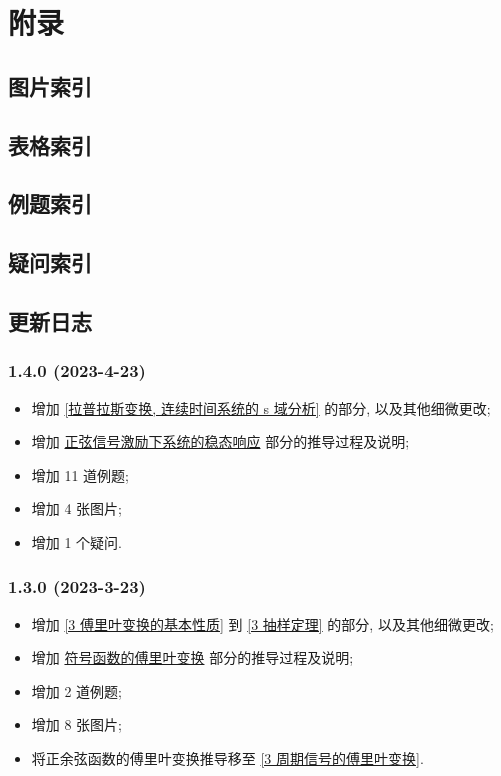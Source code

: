 \section{附录} \label{附录}
\subsection{图片索引} \label{图片索引}
\makeatletter
{}
\makeatother

\subsection{表格索引} \label{表格索引}
\makeatletter
{}
\makeatother

\subsection{例题索引} \label{例题索引}
\listofexampleprobs

\subsection{疑问索引} \label{疑问索引}
\listofquestions

\subsection{更新日志} \label{更新日志}
\subsubsection*{1.4.0 (2023-4-23)}
\begin{itemize}
    \item 增加 \ref{拉普拉斯变换, 连续时间系统的 s 域分析} 的部分, 以及其他细微更改;
    \item 增加 \hyperref[proofs 正弦信号激励下系统的稳态响应]{正弦信号激励下系统的稳态响应} 部分的推导过程及说明;
    \item 增加 11 道例题;
    \item 增加 4 张图片;
    \item 增加 1 个疑问.
\end{itemize}

\subsubsection*{1.3.0 (2023-3-23)}
\begin{itemize}
    \item 增加 \ref{3 傅里叶变换的基本性质} 到 \ref{3 抽样定理} 的部分, 以及其他细微更改;
    \item 增加 \hyperref[proofs 符号函数的傅里叶变换]{符号函数的傅里叶变换} 部分的推导过程及说明;
    \item 增加 2 道例题;
    \item 增加 8 张图片;
    \item 将正余弦函数的傅里叶变换推导移至 \ref{3 周期信号的傅里叶变换}.
\end{itemize}

